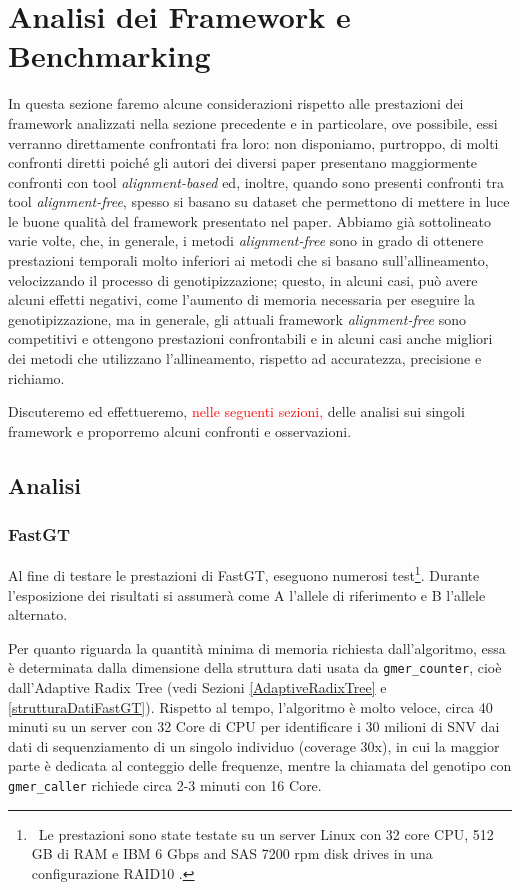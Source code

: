 \documentclass[../main.tex]{subfiles}
\begin{document}
\section{Analisi dei Framework e Benchmarking}

In questa sezione faremo alcune considerazioni rispetto alle prestazioni dei framework analizzati nella sezione precedente e in particolare, ove possibile, essi verranno direttamente confrontati fra loro: non disponiamo, purtroppo, di molti confronti diretti poiché gli autori dei diversi paper presentano maggiormente confronti con tool \textit{alignment-based} ed, inoltre, quando sono presenti confronti tra tool \textit{alignment-free}, spesso si basano su dataset che permettono di mettere in luce le buone qualità del framework presentato nel paper. Abbiamo già sottolineato varie volte, che, in generale, i metodi \textit{alignment-free} sono in grado di ottenere prestazioni temporali molto inferiori ai metodi che si basano sull'allineamento, velocizzando il processo di genotipizzazione; questo, in alcuni casi, può avere alcuni effetti negativi, come l'aumento di memoria necessaria per eseguire la genotipizzazione, ma in generale, gli attuali framework \textit{alignment-free} sono competitivi e ottengono prestazioni confrontabili e in alcuni casi anche migliori dei metodi che utilizzano l'allineamento, rispetto ad accuratezza, precisione e richiamo. 

Discuteremo ed effettueremo, \textcolor{red}{nelle seguenti sezioni,} delle analisi sui singoli framework e proporremo alcuni confronti e osservazioni.

\subsection{Analisi}

\subsubsection{FastGT}

Al fine di testare le prestazioni di FastGT, \cite{pajuste2017fastgt} eseguono numerosi test\footnote{\ Le prestazioni sono state testate su un server Linux con 32 core CPU, 512 GB di RAM e IBM 6 Gbps and SAS 7200 rpm disk drives in una configurazione RAID10 \cite{pajuste2017fastgt}.}. Durante l'esposizione dei risultati si assumerà come A l'allele di riferimento e B l'allele alternato.

Per quanto riguarda la quantità minima di memoria richiesta dall'algoritmo, essa è determinata dalla dimensione della struttura dati usata da \texttt{gmer\_counter}, cioè dall'Adaptive Radix Tree (vedi Sezioni \ref{AdaptiveRadixTree}  e \ref{strutturaDatiFastGT}). Rispetto al tempo, l'algoritmo è molto veloce, circa 40 minuti su un server con 32 Core di CPU per identificare i 30 milioni di SNV dai dati di sequenziamento di un singolo individuo (coverage 30x), in cui la maggior parte è dedicata al conteggio delle frequenze, mentre la chiamata del genotipo con \texttt{gmer\_caller} richiede circa 2-3 minuti con 16 Core.
\end{document}
